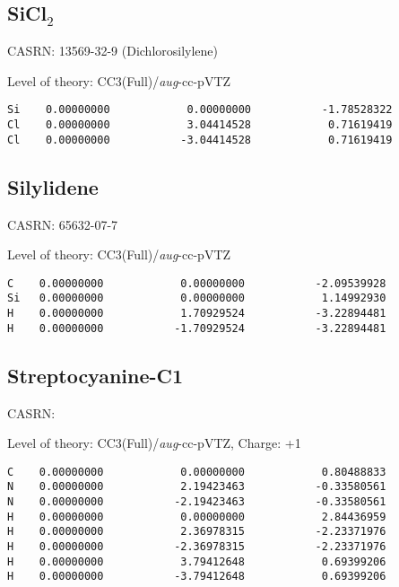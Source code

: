 \documentclass[journal=jctcce,manuscript=article,layout=traditional]{achemso}
\newcommand{\AVTZ}{\emph{aug}-cc-pVTZ}
\begin{document}
\subsection{SiCl$_2$}

CASRN: 13569-32-9 (Dichlorosilylene)

\begin{singlespace}
\noindent Level of theory: CC3(Full)/{\AVTZ}
\begin{verbatim}
Si    0.00000000            0.00000000           -1.78528322
Cl    0.00000000            3.04414528            0.71619419
Cl    0.00000000           -3.04414528            0.71619419
\end{verbatim}
\end{singlespace}

\subsection{Silylidene}

CASRN:  65632-07-7

\begin{singlespace}
\noindent Level of theory: CC3(Full)/{\AVTZ}
\begin{verbatim}
C    0.00000000            0.00000000           -2.09539928
Si   0.00000000            0.00000000            1.14992930
H    0.00000000            1.70929524           -3.22894481
H    0.00000000           -1.70929524           -3.22894481
\end{verbatim}
\end{singlespace}

\subsection{Streptocyanine-C1}

CASRN: 

\begin{singlespace}
\noindent Level of theory: CC3(Full)/{\AVTZ}, Charge: +1
\begin{verbatim}
C    0.00000000            0.00000000            0.80488833
N    0.00000000            2.19423463           -0.33580561
N    0.00000000           -2.19423463           -0.33580561
H    0.00000000            0.00000000            2.84436959
H    0.00000000            2.36978315           -2.23371976
H    0.00000000           -2.36978315           -2.23371976
H    0.00000000            3.79412648            0.69399206
H    0.00000000           -3.79412648            0.69399206
\end{verbatim}
\end{singlespace}
\end{document}
